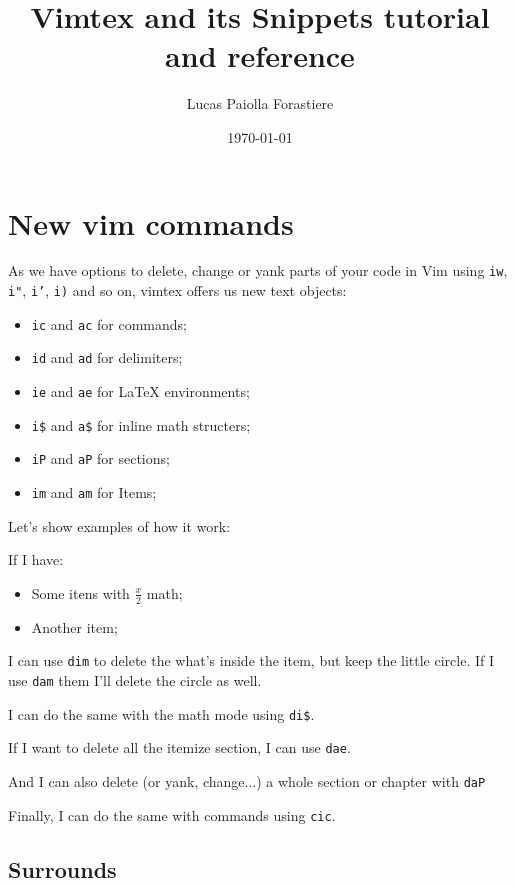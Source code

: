 \documentclass[12pt, a4paper, oneside]{book}
\title{Vimtex and its Snippets tutorial and reference}
\date{\today}
\author{Lucas Paiolla Forastiere}
\begin{document}
\maketitle
\tableofcontents
\newpage


\chapter{New vim commands}

As we have options to delete, change or yank parts of your code in Vim using
\texttt{iw}, \texttt{i"}, \texttt{i'}, \texttt{i)} and so on, vimtex offers
us new text objects:

\begin{itemize}
    \item \texttt{ic} and \texttt{ac} for commands;
    \item \texttt{id} and \texttt{ad} for delimiters;
    \item \texttt{ie} and \texttt{ae} for LaTeX environments;
    \item \texttt{i\$} and \texttt{a\$} for inline math structers;
    \item \texttt{iP} and \texttt{aP} for sections;
    \item \texttt{im} and \texttt{am} for Items;
\end{itemize}

Let's show examples of how it work:

If I have:

\begin{itemize}
    \item Some itens with $\frac{x}{2}$ math;
    \item Another item;
\end{itemize}

I can use \texttt{dim} to delete the what's inside the item, but keep
the little circle. If I use \texttt{dam} them I'll delete the circle as well.

I can do the same with the math mode using \texttt{di\$}.

If I want to delete all the itemize section, I can use \texttt{dae}.

And I can also delete (or yank, change...) a whole section or chapter with
\texttt{daP}

Finally, I can do the same with commands using \texttt{cic}.

\section{Surrounds}
\end{document}
